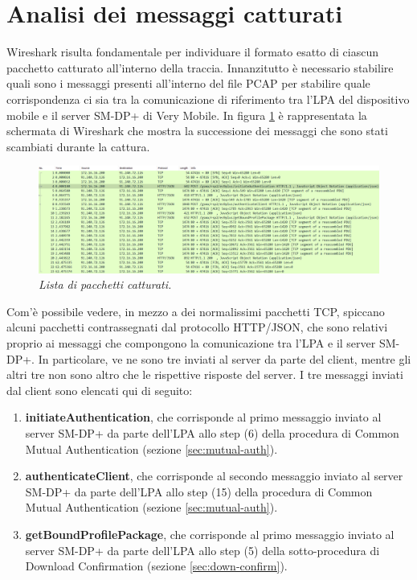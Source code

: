 \documentclass[10pt, oneside]{book}
\begin{document}
\section{Analisi dei messaggi catturati}
Wireshark risulta fondamentale per individuare il formato esatto di ciascun pacchetto catturato all'interno della traccia. Innanzitutto è necessario stabilire quali sono i messaggi presenti all'interno del file PCAP per stabilire quale corrispondenza ci sia tra la comunicazione di riferimento tra l'LPA del dispositivo mobile e il server SM-DP+ di Very Mobile. In figura \ref{fig:all-msgs-pcap} è rappresentata la schermata di Wireshark che mostra la successione dei messaggi che sono stati scambiati durante la cattura.\\
\begin{figure}
\includegraphics[width=\linewidth]{all-msgs-pcap.png}
\caption{\textit{Lista di pacchetti catturati.}}
\label{fig:all-msgs-pcap}
\end{figure}
Com'è possibile vedere, in mezzo a dei normalissimi pacchetti TCP, spiccano alcuni pacchetti contrassegnati dal protocollo HTTP/JSON, che sono relativi proprio ai messaggi che compongono la comunicazione tra l'LPA e il server SM-DP+. In particolare, ve ne sono tre inviati al server da parte del client, mentre gli altri tre non sono altro che le rispettive risposte del server. I tre messaggi inviati dal client sono elencati qui di seguito:
\begin{enumerate}
\item \textbf{initiateAuthentication}, che corrisponde al primo messaggio inviato al server SM-DP+ da parte dell'LPA allo step (6) della procedura di Common Mutual Authentication (sezione \ref{sec:mutual-auth}).
\item \textbf{authenticateClient}, che corrisponde al secondo messaggio inviato al server SM-DP+ da parte dell'LPA allo step (15) della procedura di Common Mutual Authentication (sezione \ref{sec:mutual-auth}).
\item \textbf{getBoundProfilePackage}, che corrisponde al primo messaggio inviato al server SM-DP+ da parte dell'LPA allo step (5) della sotto-procedura di Download Confirmation (sezione \ref{sec:down-confirm}).
\end{enumerate}
\end{document}
